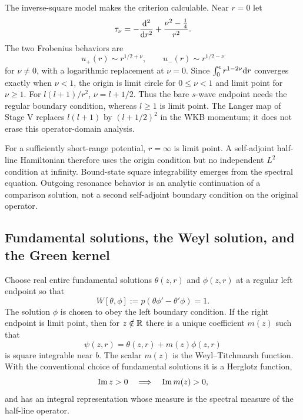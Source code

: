 The inverse-square model makes the criterion calculable.  Near $r=0$ let
\begin{equation}
  \tau_\nu=-\frac{\mathrm{d}^2}{\mathrm{d} r^2}
  +\frac{\nu^2-\tfrac14}{r^2}.
  \label{eq:inverse-square-endpoint-model}
\end{equation}
The two Frobenius behaviors are
\begin{equation}
  u_+(r)\sim r^{1/2+\nu},
  \qquad
  u_-(r)\sim r^{1/2-\nu}
  \label{eq:inverse-square-frobenius}
\end{equation}
for $\nu\ne0$, with a logarithmic replacement at $\nu=0$.  Since
$\int_0^\epsilon r^{1-2\nu}\mathrm{d} r$ converges exactly when $\nu<1$, the
origin is limit circle for $0\leq\nu<1$ and limit point for $\nu\geq1$.
For $l(l+1)/r^2$, $\nu=l+1/2$.  Thus the bare $s$-wave endpoint needs the
regular boundary condition, whereas $l\geq1$ is limit point.  The Langer map
of Stage V replaces $l(l+1)$ by $(l+1/2)^2$ in the WKB momentum; it does not
erase this operator-domain analysis.

For a sufficiently short-range potential, $r=\infty$ is limit point.  A
self-adjoint half-line Hamiltonian therefore uses the origin condition but no
independent $L^2$ condition at infinity.  Bound-state square integrability
emerges from the spectral equation.  Outgoing resonance behavior is an
analytic continuation of a comparison solution, not a second self-adjoint
boundary condition on the original operator.

\subsection{Fundamental solutions, the Weyl solution, and the Green kernel}
\label{subsec:weyl-m-green}

Choose real entire fundamental solutions $\theta(z,r)$ and $\phi(z,r)$ at a
regular left endpoint so that
\begin{equation}
  W[\theta,\phi]
  :=p(\theta\phi'-\theta'\phi)=1.
  \label{eq:sl-fundamental-wronskian}
\end{equation}
The solution $\phi$ is chosen to obey the left boundary condition.  If the
right endpoint is limit point, then for $z\notin\mathbb{R}$ there is a unique
coefficient $m(z)$ such that
\begin{equation}
  \psi(z,r)=\theta(z,r)+m(z)\phi(z,r)
  \label{eq:weyl-solution}
\end{equation}
is square integrable near $b$.  The scalar $m(z)$ is the Weyl--Titchmarsh
function.  With the conventional choice of fundamental solutions it is a
Herglotz function,
\begin{equation}
  \operatorname{Im} z>0
  \quad\Longrightarrow\quad
  \operatorname{Im} m(z)>0,
  \label{eq:m-herglotz}
\end{equation}
and has an integral representation whose measure is the spectral measure of
the half-line operator.

